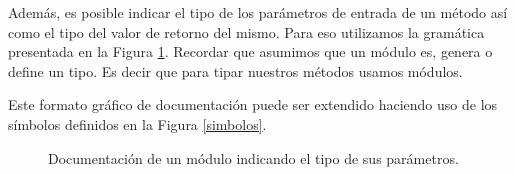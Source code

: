Además, es posible indicar el tipo de los parámetros de entrada de un método así como el tipo del valor de retorno del mismo. Para eso utilizamos la gramática presentada en la Figura \ref{parametros}. Recordar que asumimos que un módulo es, genera o define un tipo. Es decir que para tipar nuestros métodos usamos módulos.

Este formato gráfico de documentación puede ser extendido haciendo uso de los símbolos definidos en la Figura \ref{simbolos}. 

\begin{figure}[H]
\begin{center}
\caption{Documentación de un módulo indicando el tipo de sus parámetros.}
\label{parametros}
\end{center}
\end{figure}

 

